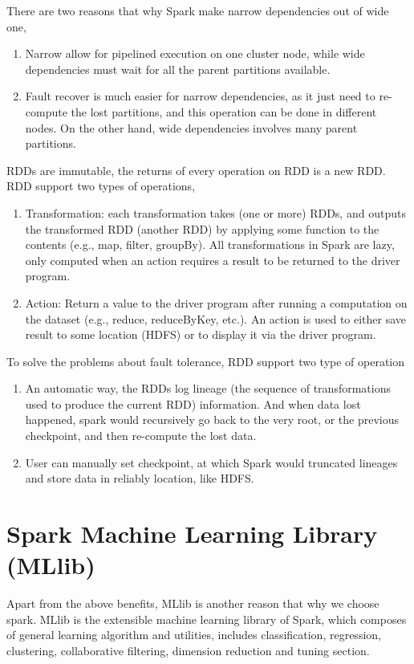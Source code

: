 There are two reasons that why Spark make narrow dependencies out of wide one\cite[Chapter~5]{zaharia2012resilient},
\begin{enumerate}
	\item Narrow allow for pipelined execution on one cluster node, while wide dependencies must wait for all the parent partitions available.
	\item Fault recover is much easier for narrow dependencies, as it just need to re-compute the lost partitions, and this operation can be done in different nodes. On the other hand, wide dependencies involves many parent partitions.
\end{enumerate}

RDDs are immutable, the returns of every operation on RDD is a new RDD. RDD support two types of operations,

\begin{enumerate}
	\item Transformation\cite[Section~2.2]{zaharia2012resilient}: each transformation takes (one or more) RDDs, and outputs the transformed RDD (another RDD) by applying some function to the contents (e.g., map, filter, groupBy). All transformations in Spark are lazy, only computed when an action requires a result to be returned to the driver program.
	\item Action\cite[Section~2.3]{zaharia2012resilient}: Return a value to the driver program after running a computation on the dataset (e.g., reduce, reduceByKey, etc.). An action is used to either save result to some location (HDFS) or to display it via the driver program.
\end{enumerate}

To solve the problems about fault tolerance, RDD support two type of operation

\begin{enumerate}
	\item An automatic way, the RDDs log lineage (the sequence of transformations used to produce the current RDD) information\cite[Section~2.5]{zaharia2012resilient}. And when data lost happened, spark would recursively go back to the very root, or the previous checkpoint, and then re-compute the lost data.
	\item User can manually set checkpoint, at which Spark would truncated lineages and store data in reliably location, like HDFS\cite[Section~5.3]{zaharia2012resilient}.
\end{enumerate}

\section{Spark Machine Learning Library (MLlib)}
Apart from the above benefits, MLlib is another reason that why we choose spark. MLlib is the extensible machine learning  library of Spark, which composes of general learning algorithm and utilities, includes classification, regression, clustering, collaborative filtering, dimension reduction and tuning section\cite{meng2016mllib}.\\



